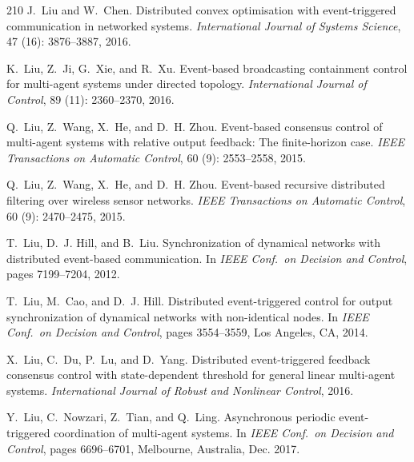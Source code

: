\documentclass{autart}
\begin{document}
{\begin{thebibliography}{210}
J.~Liu and W.~Chen.
\newblock Distributed convex optimisation with event-triggered communication in
  networked systems.
\newblock \emph{International Journal of Systems Science}, 47
  (16): 3876--3887, 2016.

K.~Liu, Z.~Ji, G.~Xie, and R.~Xu.
\newblock Event-based broadcasting containment control for multi-agent systems
  under directed topology.
\newblock \emph{International Journal of Control}, 89 (11):
  2360--2370, 2016{}.

Q.~Liu, Z.~Wang, X.~He, and D.~H. Zhou.
\newblock Event-based consensus control of multi-agent systems with relative
  output feedback: The finite-horizon case.
\newblock \emph{IEEE Transactions on Automatic Control}, 60
  (9): 2553--2558, 2015{}.

Q.~Liu, Z.~Wang, X.~He, and D.~H. Zhou.
\newblock Event-based recursive distributed filtering over wireless sensor
  networks.
\newblock \emph{IEEE Transactions on Automatic Control}, 60
  (9): 2470--2475, 2015{}.

T.~Liu, D.~J. Hill, and B.~Liu.
\newblock Synchronization of dynamical networks with distributed event-based
  communication.
\newblock In \emph{{IEEE} Conf.\ on Decision and Control}, pages 7199--7204,
  2012{}.

T.~Liu, M.~Cao, and D.~J. Hill.
\newblock Distributed event-triggered control for output synchronization of
  dynamical networks with non-identical nodes.
\newblock In \emph{{IEEE} Conf.\ on Decision and Control}, pages 3554--3559,
  Los Angeles, CA, 2014.

X.~Liu, C.~Du, P.~Lu, and D.~Yang.
\newblock Distributed event-triggered feedback consensus control with
  state-dependent threshold for general linear multi-agent systems.
\newblock \emph{International Journal of Robust and Nonlinear Control},
  2016{}.

Y.~Liu, C.~Nowzari, Z.~Tian, and Q.~Ling.
\newblock Asynchronous periodic event-triggered coordination of multi-agent
  systems.
\newblock In \emph{{IEEE} Conf.\ on Decision and Control}, pages 6696--6701,
  Melbourne, Australia, Dec. 2017.


\end{thebibliography}}
\end{document}

